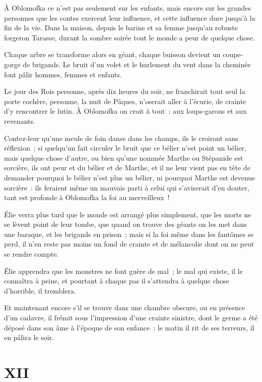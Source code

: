 \documentclass[french,twoside]{book} %
\begin{document}
À Oblomofka ce n’est pas seulement sur les enfants, mais encore sur les grandes personnes que les contes exercent leur influence, et cette influence dure jusqu’à la fin de la vie. Dans la maison, depuis le barine et sa femme jusqu’au robuste forgeron Tarasse, durant la sombre soirée tout le monde a peur de quelque chose.\par
Chaque arbre se transforme alors en géant, chaque buisson devient un coupe-gorge de brigands. Le bruit d’un volet et le hurlement du vent dans la cheminée font pâlir hommes, femmes et enfants.\par
Le jour des Rois personne, après dix heures du soir, ne franchirait tout seul la porte cochère, personne, la nuit de Pâques, n’oserait aller à l’écurie, de crainte d’y rencontrer le lutin. À Oblomofka on croit à tout : aux loups-garous et aux revenants.\par
Contez-leur qu’une meule de foin danse dans les champs, ils le croiront sans réflexion ; si quelqu’un fait circuler le bruit que ce bélier n’est point un bélier, mais quelque chose d’autre, ou bien qu’une nommée Marthe ou Stépanide est sorcière, ils ont peur et du bélier et de Marthe, et il ne leur vient pas en tête de demander pourquoi le bélier n’est plus un bélier, ni pourquoi Marthe est devenue sorcière : ils feraient même un mauvais parti à celui qui s’aviserait d’en douter, tant est profonde à Oblomofka la foi au merveilleux !\par
Élie verra plus tard que le monde est arrangé plus simplement, que les morts ne se lèvent point de leur tombe, que quand on trouve des géants on les met dans une baraque, et les brigands en prison ; mais si la foi même dans les fantômes se perd, il n’en reste pas moins un fond de crainte et de mélancolie dont on ne peut se rendre compte.\par
Élie apprendra que les monstres ne font guère de mal ; le mal qui existe, il le connaîtra à peine, et pourtant à chaque pas il s’attendra à quelque chose d’horrible, il tremblera.\par
Et maintenant encore s’il se trouve dans une chambre obscure, ou en présence d’un cadavre, il frémit sous l’impression d’une crainte sinistre, dont le germe a été déposé dans son âme à l’époque de son enfance : le matin il rit de ses terreurs, il en pâlira le soir.
\section[{XII}]{XII}\renewcommand{\leftmark}{XII}
\end{document}
